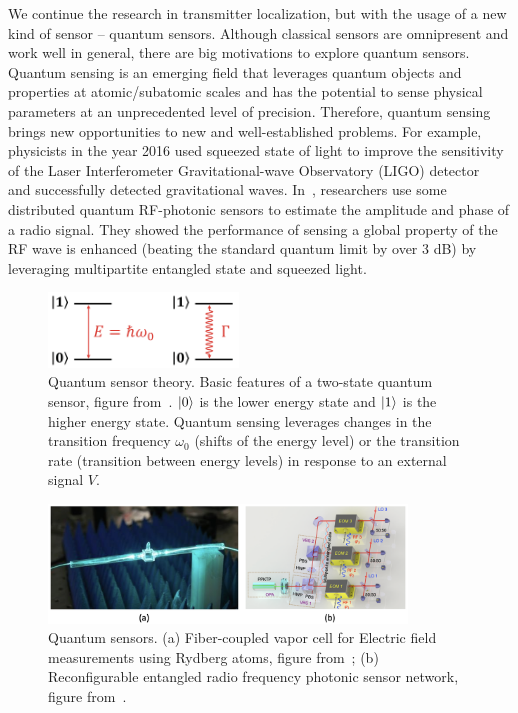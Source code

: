 We continue the research in transmitter localization, but with the usage of a new kind of sensor -- quantum sensors.
Although classical sensors are omnipresent and work well in general, there are big motivations to explore quantum sensors.
Quantum sensing is an emerging field that leverages quantum objects and properties at atomic/subatomic scales and has 
the potential to sense physical parameters at an unprecedented level of precision.
Therefore, quantum sensing brings new opportunities to new and well-established problems.
For example, physicists in the year 2016 used squeezed state of light to improve the sensitivity of the Laser Interferometer 
Gravitational-wave Observatory (LIGO) detector~\cite{ligo_2015} and successfully detected gravitational waves.
In~\cite{PRL20-qsn}, researchers use some distributed quantum RF-photonic sensors to estimate the amplitude and phase of a radio signal.
They showed the performance of sensing a global property of the RF wave is enhanced (beating the standard quantum limit by over 3 dB)
by leveraging multipartite entangled state and squeezed light.


\begin{figure}[t]
      \centering
      \includegraphics[width=0.45\textwidth]{chapters/introduction/figures/qsensor.png}
      \caption{Quantum sensor theory. Basic features of a two-state quantum sensor, figure from~\cite{RevModPhys.quantumsensing}.
               $\ket{0}$ is the lower energy state and $\ket{1}$ is the higher energy state. Quantum sensing leverages changes in the
               transition frequency $\omega_{0}$ (shifts of the energy level) or the transition rate (transition between energy levels) 
               in response to an external signal $V$.} 
      \label{fig:intro-qsensor}
\end{figure}

\begin{figure}[t]
      \centering
      \includegraphics[width=0.85\textwidth]{chapters/introduction/figures/qsensor2.png}
      \caption{Quantum sensors. (a) Fiber-coupled vapor cell for Electric field measurements using Rydberg atoms, figure from~\cite{rydberg};
               (b) Reconfigurable entangled radio frequency photonic sensor network, figure from~\cite{PRL20-qsn}.} 
      \label{fig:intro-qsensor2}
\end{figure}

